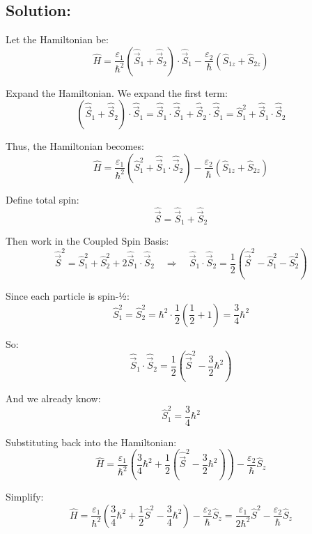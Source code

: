\documentclass[12pt]{article}
\begin{document}
    \subsection{Solution:}
        Let the Hamiltonian be:
        \[
            \hat{H} = \frac{\varepsilon_1}{\hbar^2} (\hat{\vec{S}}_1 + \hat{\vec{S}}_2) \cdot \hat{\vec{S}}_1 - \frac{\varepsilon_2}{\hbar} (\hat{S}_{1z} + \hat{S}_{2z})
        \]

        Expand the Hamiltonian. We expand the first term:
        \[
            (\hat{\vec{S}}_1 + \hat{\vec{S}}_2) \cdot \hat{\vec{S}}_1 = \hat{\vec{S}}_1 \cdot \hat{\vec{S}}_1 + \hat{\vec{S}}_2 \cdot \hat{\vec{S}}_1 = \hat{S}_1^2 + \hat{\vec{S}}_1 \cdot \hat{\vec{S}}_2
        \]

        Thus, the Hamiltonian becomes:
        \[
        \hat{H} = \frac{\varepsilon_1}{\hbar^2} \left( \hat{S}_1^2 + \hat{\vec{S}}_1 \cdot \hat{\vec{S}}_2 \right) - \frac{\varepsilon_2}{\hbar} ( \hat{S}_{1z} + \hat{S}_{2z} )
        \]
        
        Define total spin:
        \[
            \hat{\vec{S}} = \hat{\vec{S}}_1 + \hat{\vec{S}}_2
        \]

        Then work in the Coupled Spin Basis:
        \[
            \hat{\vec{S}}^2 = \hat{S}_1^2 + \hat{S}_2^2 + 2 \hat{\vec{S}}_1 \cdot \hat{\vec{S}}_2
            \quad \Rightarrow \quad
            \hat{\vec{S}}_1 \cdot \hat{\vec{S}}_2 = \frac{1}{2} \left( \hat{\vec{S}}^2 - \hat{S}_1^2 - \hat{S}_2^2 \right)
        \]

        Since each particle is spin-½:
        \[
            \hat{S}_1^2 = \hat{S}_2^2 = \hbar^2 \cdot \frac{1}{2} \left( \frac{1}{2} + 1 \right) = \frac{3}{4} \hbar^2
        \]

        So:
        \[
            \hat{\vec{S}}_1 \cdot \hat{\vec{S}}_2 = \frac{1}{2} \left( \hat{\vec{S}}^2 - \frac{3}{2} \hbar^2 \right)
        \]

        And we already know:
        \[
            \hat{S}_1^2 = \frac{3}{4} \hbar^2
        \]

        Substituting back into the Hamiltonian:
        \[
            \hat{H} = \frac{\varepsilon_1}{\hbar^2} \left( \frac{3}{4} \hbar^2 + \frac{1}{2} \left( \hat{\vec{S}}^2 - \frac{3}{2} \hbar^2 \right) \right) - \frac{\varepsilon_2}{\hbar} \hat{S}_z
        \]

        Simplify:
        \[
            \hat{H} = \frac{\varepsilon_1}{\hbar^2} \left( \frac{3}{4} \hbar^2 + \frac{1}{2} \hat{S}^2 - \frac{3}{4} \hbar^2 \right) - \frac{\varepsilon_2}{\hbar} \hat{S}_z
            = \frac{\varepsilon_1}{2\hbar^2} \hat{S}^2 - \frac{\varepsilon_2}{\hbar} \hat{S}_z
        \]
\end{document}
